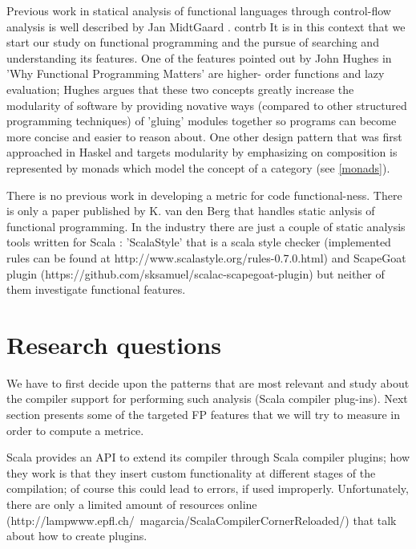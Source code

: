\documentclass{article}
\begin{document}
Previous work in statical analysis of functional languages through control-flow analysis is well described by Jan MidtGaard \cite{Midtgaard:2012:CAF:2187671.2187672}. contrb
   It is in this context that we start our study on functional programming and the pursue of searching and understanding its features. One of the features pointed out by John Hughes \cite{DBLP:journals/cj/Hughes89} in 'Why Functional Programming Matters' are higher- order functions and lazy evaluation; Hughes argues that these two concepts greatly increase the modularity of software by providing novative ways (compared to other structured programming techniques) of 'gluing' modules together so programs can become more concise and easier to reason about. One other design pattern that was first approached in Haskel and targets modularity by emphasizing on composition is represented by monads which model the concept of a category (see \ref{monads}). \par 

There is no previous work in developing a metric for code functional-ness. There is only a paper published by K. van den Berg \cite{DBLP:journals/infsof/BergB95} that handles static anlysis of functional programming. In the industry there are just a couple of static analysis tools written for Scala : 'ScalaStyle' that is a scala style checker  (implemented rules can be found at http://www.scalastyle.org/rules-0.7.0.html) and ScapeGoat plugin (https://github.com/sksamuel/scalac-scapegoat-plugin) but neither of them investigate functional features. \par


\section{Research questions}

We have to first decide upon the patterns that are most relevant and study about the compiler support for performing such analysis (Scala compiler plug-ins). Next section presents some of the targeted FP features that we will try to measure in order to compute a metrice. \par

Scala provides an API to extend its compiler through Scala compiler plugins; how they work is that they insert custom functionality at different stages of the compilation; of course this could lead to errors, if used improperly. Unfortunately, there are only a limited amount of resources online (http://lampwww.epfl.ch/~magarcia/ScalaCompilerCornerReloaded/) that talk about how to create plugins. \par
\end{document}
